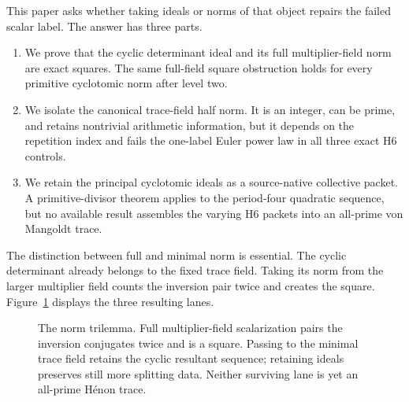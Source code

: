 \documentclass[11pt]{article}
\theoremstyle{definition}\newtheorem{definition}[theorem]{Definition}
\theoremstyle{remark}\newtheorem{remark}[theorem]{Remark}
\begin{document}
This paper asks whether taking ideals or norms of that object repairs the
failed scalar label.  The answer has three parts.
\begin{enumerate}
\item We prove that the cyclic determinant ideal and its full
multiplier-field norm are exact squares.  The same full-field square
obstruction holds for every primitive cyclotomic norm after level two.
\item We isolate the canonical trace-field half norm.  It is an integer,
can be prime, and retains nontrivial arithmetic information, but it depends
on the repetition index and fails the one-label Euler power law in all three
exact H6 controls.
\item We retain the principal cyclotomic ideals as a source-native collective
packet.  A primitive-divisor theorem applies to the period-four quadratic
sequence, but no available result assembles the varying H6 packets into an
all-prime von Mangoldt trace.
\end{enumerate}

The distinction between full and minimal norm is essential.  The cyclic
determinant already belongs to the fixed trace field.  Taking its norm from
the larger multiplier field counts the inversion pair twice and creates the
square.  Figure~\ref{fig:trilemma} displays the three resulting lanes.

\begin{figure}[t]
\centering
{}
\caption{The norm trilemma.  Full multiplier-field scalarization pairs the
inversion conjugates twice and is a square.  Passing to the minimal trace
field retains the cyclic resultant sequence; retaining ideals preserves still
more splitting data.  Neither surviving lane is yet an all-prime H\'enon
trace.}
\label{fig:trilemma}
\end{figure}
\end{document}
